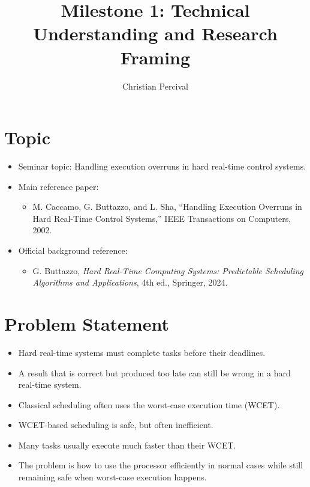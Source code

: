 \documentclass[a4paper,11pt]{article}
\title{Milestone 1: Technical Understanding and Research Framing}
\author{Christian Percival}
\date{}
\begin{document}
\maketitle

\section*{Topic}

\begin{itemize}
    \item Seminar topic: Handling execution overruns in hard real-time control systems.
    \item Main reference paper:
    \begin{itemize}
        \item M. Caccamo, G. Buttazzo, and L. Sha, ``Handling Execution Overruns in Hard Real-Time Control Systems,'' IEEE Transactions on Computers, 2002.
    \end{itemize}
    \item Official background reference:
    \begin{itemize}
        \item G. Buttazzo, \textit{Hard Real-Time Computing Systems: Predictable Scheduling Algorithms and Applications}, 4th ed., Springer, 2024.
    \end{itemize}
\end{itemize}

\section*{Problem Statement}

\begin{itemize}
    \item Hard real-time systems must complete tasks before their deadlines.
    \item A result that is correct but produced too late can still be wrong in a hard real-time system.
    \item Classical scheduling often uses the worst-case execution time (WCET).
    \item WCET-based scheduling is safe, but often inefficient.
    \item Many tasks usually execute much faster than their WCET.
    \item The problem is how to use the processor efficiently in normal cases while still remaining safe when worst-case execution happens.
\end{itemize}
\end{document}
